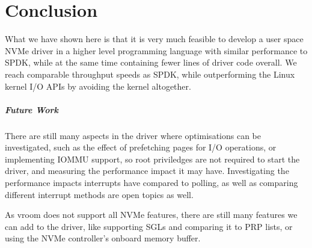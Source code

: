 \chapter{Conclusion}\label{c:c}
What we have shown here is that it is very much feasible to develop a user space NVMe driver in a higher level programming language with similar performance to SPDK, while at the same time containing fewer lines of driver code overall. We reach comparable throughput speeds as SPDK, while outperforming the Linux kernel I/O APIs by avoiding the kernel altogether.

\paragraph{Future Work}
There are still many aspects in the driver where optimisations can be investigated, such as the effect of prefetching pages for I/O operations, or implementing IOMMU support, so root priviledges are not required to start the driver, and measuring the performance impact it may have. Investigating the performance impacts interrupts have compared to polling, as well as comparing different interrupt methods are open topics as well.

As vroom does not support all NVMe features, there are still many features we can add to the driver, like supporting SGLs and comparing it to PRP lists, or using the NVMe controller's onboard memory buffer.
